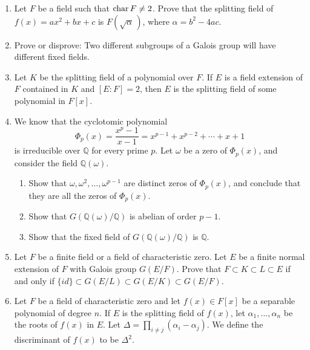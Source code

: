 {\begin{enumerate}
\item
Let $F$ be a field such that ${\rm char}\, F \neq 2$. Prove that the
splitting field of $f(x) = a x^2 + b x + c$ is $F( \sqrt{\alpha}\, )$,
where $\alpha = b^2 - 4ac$. 
 
 
\item
Prove or disprove: Two different subgroups of a Galois group will
have different fixed fields.
 
 
 
\item
Let $K$ be the splitting field of a polynomial over $F$. If $E$ is a
field extension of $F$ contained in $K$ and $[E:F] = 2$, then $E$ is
the splitting field of some polynomial in $F[x]$.
 
  
 
\item
We know that the cyclotomic polynomial
\[
\Phi_p(x) = \frac{x^p - 1}{x-1} = x^{p-1} + x^{p-2} + \cdots
+ x + 1
\]
is irreducible over ${\mathbb Q}$ for every prime $p$. Let $\omega$ be a
zero of $\Phi_p(x)$, and consider the field ${\mathbb Q}(\omega)$.
\begin{enumerate}
 
 \item
Show that $\omega, \omega^2, \ldots, \omega^{p-1}$ are distinct zeros of
$\Phi_p(x)$, and conclude that they are all the zeros of $\Phi_p(x)$.
 
 \item
Show that $G( {\mathbb Q}( \omega ) / {\mathbb Q} )$ is abelian of order
$p-1$. 
 
 \item
Show that the fixed field of $G( {\mathbb Q}( \omega ) / {\mathbb Q} )$ is
${\mathbb Q}$. 
 
\end{enumerate}
 
  
\item
Let $F$ be a finite field or a field of characteristic zero.
Let $E$ be a finite normal extension of $F$ with Galois group
$G(E/F)$. Prove that $F \subset K \subset L \subset E$ if and 
only if $\{ id \} \subset G(E/L) \subset G(E/K) \subset G(E/F)$.
 
 
\item
Let $F$ be a field of characteristic zero and let $f(x) \in F[x]$ be
a separable polynomial of degree $n$. If $E$ is the splitting field
of $f(x)$, let $\alpha_1, \ldots, \alpha_n$ be the roots of $f(x)$ in
$E$. Let $\Delta = \prod_{i \neq j} (\alpha_i - \alpha_j)$.  We
define the {\bfi discriminant\/}\label{discriminant} of $f(x)$ to be $\Delta^2$. 
\begin{enumerate}
 

\end{enumerate}
\end{enumerate}}
